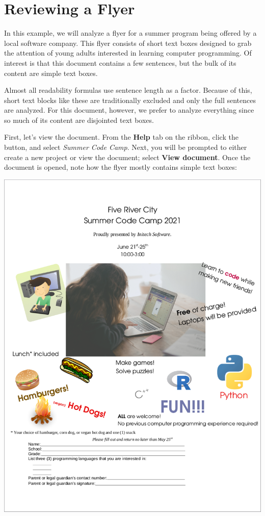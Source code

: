 \documentclass[
]{book}
\theoremstyle{definition}
\theoremstyle{definition}
\theoremstyle{definition}
\theoremstyle{definition}
\theoremstyle{remark}
\begin{document}
\hypertarget{reviewing-a-flyer}{%
\section{Reviewing a Flyer}\label{reviewing-a-flyer}}

In this example, we will analyze a flyer for a summer program being offered by a local software company. This flyer consists of short text boxes designed to grab the attention of young adults interested in learning computer programming. Of interest is that this document contains a few sentences, but the bulk of its content are simple text boxes.

Almost all readability formulas use sentence length as a factor. Because of this, short text blocks like these are traditionally excluded and only the full sentences are analyzed. For this document, however, we prefer to analyze everything since so much of its content are disjointed text boxes.

First, let's view the document. From the \textbf{Help} tab on the ribbon, click the  button, and select \emph{Summer Code Camp}. Next, you will be prompted to either create a new project or view the document; select \textbf{View document}. Once the document is opened, note how the flyer mostly contains simple text boxes:

\begin{center}\includegraphics[width=0.75\linewidth,]{Images/NonGenerated/SummerCodeCampFlyer} \end{center}
\end{document}
